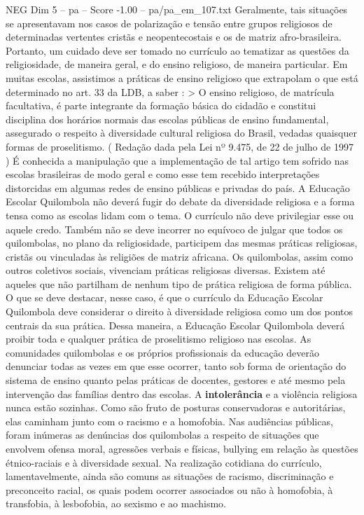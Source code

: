 \begin{textsample}{NEG Dim 5 – pa – Score -1.00 – pa/pa\_em\_107.txt}
Geralmente, tais situações se apresentavam nos casos de polarização e tensão entre grupos religiosos de determinadas vertentes cristãs e neopentecostais e os de matriz afro-brasileira.
Portanto, um cuidado deve ser tomado no currículo ao tematizar as questões da religiosidade, de maneira geral, e do ensino religioso, de maneira particular.
Em muitas escolas, assistimos a práticas de ensino religioso que extrapolam o que está determinado no art. 33 da LDB, a saber : > O ensino religioso, de matrícula facultativa, é parte integrante da formação básica do cidadão e constitui disciplina dos horários normais das escolas públicas de ensino fundamental, assegurado o respeito à diversidade cultural religiosa do Brasil, vedadas quaisquer formas de proselitismo. ( Redação dada pela Lei nº 9.475, de 22 de julho de 1997 ) É conhecida a manipulação que a implementação de tal artigo tem sofrido nas escolas brasileiras de modo geral e como esse tem recebido interpretações distorcidas em algumas redes de ensino públicas e privadas do país.
A Educação Escolar Quilombola não deverá fugir do debate da diversidade religiosa e a forma tensa como as escolas lidam com o tema.
O currículo não deve privilegiar esse ou aquele credo.
Também não se deve incorrer no equívoco de julgar que todos os quilombolas, no plano da religiosidade, participem das mesmas práticas religiosas, cristãs ou vinculadas às religiões de matriz africana.
Os quilombolas, assim como outros coletivos sociais, vivenciam práticas religiosas diversas.
Existem até aqueles que não partilham de nenhum tipo de prática religiosa de forma pública.
O que se deve destacar, nesse caso, é que o currículo da Educação Escolar Quilombola deve considerar o direito à diversidade religiosa como um dos pontos centrais da sua prática.
Dessa maneira, a Educação Escolar Quilombola deverá proibir toda e qualquer prática de proselitismo religioso nas escolas.
As comunidades quilombolas e os próprios profissionais da educação deverão denunciar todas as vezes em que esse ocorrer, tanto sob forma de orientação do sistema de ensino quanto pelas práticas de docentes, gestores e até mesmo pela intervenção das famílias dentro das escolas.
A \textbf{intolerância} e a violência religiosa nunca estão sozinhas.
Como são fruto de posturas conservadoras e autoritárias, elas caminham junto com o racismo e a homofobia.
Nas audiências públicas, foram inúmeras as denúncias dos quilombolas a respeito de situações que envolvem ofensa moral, agressões verbais e físicas, bullying em relação às questões étnico-raciais e à diversidade sexual.
Na realização cotidiana do currículo, lamentavelmente, ainda são comuns as situações de racismo, discriminação e preconceito racial, os quais podem ocorrer associados ou não à homofobia, à transfobia, à lesbofobia, ao sexismo e ao machismo.

\end{textsample}
